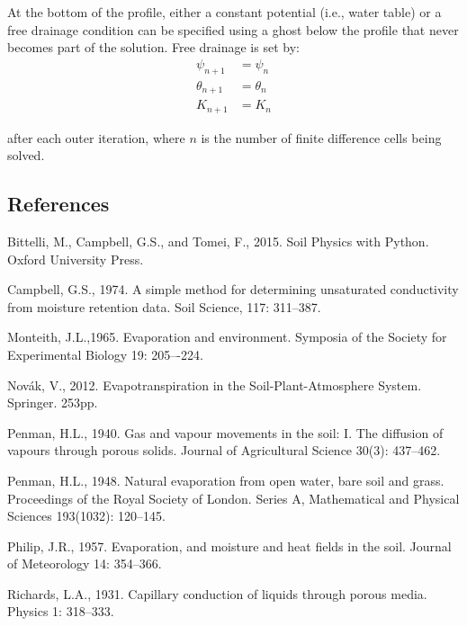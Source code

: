 \documentclass[10pt, letterpapr]{article}
\begin{document}
At the bottom of the profile, either a constant potential (i.e., water table) or a free drainage condition can be specified using a ghost below the profile that never becomes part of the solution. Free drainage is set by:
\begin{align*}
	\psi_{n+1} &=\psi_n \\
	\theta_{n+1} &=\theta_n \\
	K_{n+1} &=K_n
\end{align*}

\noindent after each outer iteration, where $n$ is the number of finite difference cells being solved.

\newpage
\subsection*{References}

Bittelli, M., Campbell, G.S., and Tomei, F., 2015. Soil Physics with Python. Oxford University Press.

Campbell, G.S., 1974. A simple method for determining unsaturated conductivity from moisture retention data. Soil Science, 117: 311--387.

Monteith, J.L.,1965. Evaporation and environment. Symposia of the Society for Experimental Biology 19: 205–-224.

Nov\'ak, V., 2012. Evapotranspiration in the Soil-Plant-Atmosphere System. Springer. 253pp.

Penman, H.L., 1940. Gas and vapour movements in the soil: I. The diffusion of vapours through porous solids. Journal of Agricultural Science 30(3): 437--462.

Penman, H.L., 1948. Natural evaporation from open water, bare soil and grass. Proceedings of the Royal Society of London. Series A, Mathematical and Physical Sciences 193(1032): 120--145.

Philip, J.R., 1957. Evaporation, and moisture and heat fields in the soil. Journal of Meteorology 14: 354--366.

Richards, L.A., 1931. Capillary conduction of liquids through porous media. Physics 1: 318--333.
\end{document}

